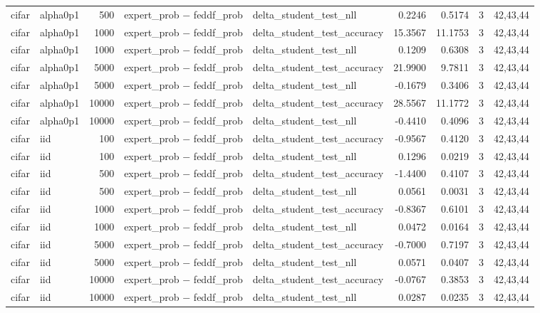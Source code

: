 \begin{tabular}{llrllrrrl}
cifar & alpha0p1 & 500 & expert\_prob − feddf\_prob & delta\_student\_test\_nll & 0.2246 & 0.5174 & 3 & 42,43,44 \\
cifar & alpha0p1 & 1000 & expert\_prob − feddf\_prob & delta\_student\_test\_accuracy & 15.3567 & 11.1753 & 3 & 42,43,44 \\
cifar & alpha0p1 & 1000 & expert\_prob − feddf\_prob & delta\_student\_test\_nll & 0.1209 & 0.6308 & 3 & 42,43,44 \\
cifar & alpha0p1 & 5000 & expert\_prob − feddf\_prob & delta\_student\_test\_accuracy & 21.9900 & 9.7811 & 3 & 42,43,44 \\
cifar & alpha0p1 & 5000 & expert\_prob − feddf\_prob & delta\_student\_test\_nll & -0.1679 & 0.3406 & 3 & 42,43,44 \\
cifar & alpha0p1 & 10000 & expert\_prob − feddf\_prob & delta\_student\_test\_accuracy & 28.5567 & 11.1772 & 3 & 42,43,44 \\
cifar & alpha0p1 & 10000 & expert\_prob − feddf\_prob & delta\_student\_test\_nll & -0.4410 & 0.4096 & 3 & 42,43,44 \\
cifar & iid & 100 & expert\_prob − feddf\_prob & delta\_student\_test\_accuracy & -0.9567 & 0.4120 & 3 & 42,43,44 \\
cifar & iid & 100 & expert\_prob − feddf\_prob & delta\_student\_test\_nll & 0.1296 & 0.0219 & 3 & 42,43,44 \\
cifar & iid & 500 & expert\_prob − feddf\_prob & delta\_student\_test\_accuracy & -1.4400 & 0.4107 & 3 & 42,43,44 \\
cifar & iid & 500 & expert\_prob − feddf\_prob & delta\_student\_test\_nll & 0.0561 & 0.0031 & 3 & 42,43,44 \\
cifar & iid & 1000 & expert\_prob − feddf\_prob & delta\_student\_test\_accuracy & -0.8367 & 0.6101 & 3 & 42,43,44 \\
cifar & iid & 1000 & expert\_prob − feddf\_prob & delta\_student\_test\_nll & 0.0472 & 0.0164 & 3 & 42,43,44 \\
cifar & iid & 5000 & expert\_prob − feddf\_prob & delta\_student\_test\_accuracy & -0.7000 & 0.7197 & 3 & 42,43,44 \\
cifar & iid & 5000 & expert\_prob − feddf\_prob & delta\_student\_test\_nll & 0.0571 & 0.0407 & 3 & 42,43,44 \\
cifar & iid & 10000 & expert\_prob − feddf\_prob & delta\_student\_test\_accuracy & -0.0767 & 0.3853 & 3 & 42,43,44 \\
cifar & iid & 10000 & expert\_prob − feddf\_prob & delta\_student\_test\_nll & 0.0287 & 0.0235 & 3 & 42,43,44 \\

\end{tabular}
